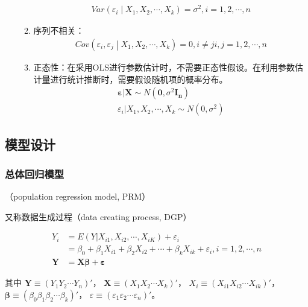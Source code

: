 \documentclass[12pt]{book}
\begin{document}
\begin{enumerate}[1.]
\begin{enumerate}[(1)]
                    \begin{gather*}
                        Var\left(\varepsilon_i\middle| X_1,X_2,\cdots,X_k\right)=\sigma^2,i=1,2,\cdots,n
                    \end{gather*}
              \item 序列不相关：
                    \begin{gather*}
                        Cov\left (\varepsilon_i,\varepsilon_j\middle| X_1,X_2,\cdots,X_k\right)=0,i\neq j  i,j=1,2,\cdots,n
                    \end{gather*}
              \item 正态性：在采用OLS进行参数估计时，不需要正态性假设。在利用参数估计量进行统计推断时，需要假设随机项的概率分布。
                    \begin{gather*}
                        \bm{\varepsilon}|\mathbf{X}\sim N(\mathbf{0},\sigma^2\mathbf{I_n})\\
                        \varepsilon_i|X_1,X_2,\cdots,X_k\sim N(0,\sigma^2)
                    \end{gather*}
          \end{enumerate}
\end{enumerate}



\subsection{模型设计}

\subsubsection{总体回归模型}

（population regression model, PRM）

又称数据生成过程（data creating process, DGP）

\begin{align*}
Y_{i} &= E(Y|X_{i1},X_{i2},\cdots,X_{iK})+\varepsilon_{i}\\ 
&=\beta_{0} + \beta_{1}X_{i1}+\beta_{2}X_{i2}+\cdots+\beta_{k}X_{ik}+\varepsilon_{i}, i=1,2,⋯,n\\ 
\bm{Y}&=\bm{X\beta}+\bm{\varepsilon}
\end{align*}


其中
$\bm{Y}\equiv (Y_{1} Y_{2} \cdots  Y_{n})'$，
$\bm{X}\equiv (X_{1} X_{2} \cdots X_{k})'$，
$X_{i}\equiv (X_{i1} X_{i2} ⋯ X_{ik})'$，
$\bm{\beta}\equiv (\beta_{0} \beta_{1} \beta_{2} \cdots \beta_{k})'$，
$\varepsilon \equiv (\varepsilon_{1} \varepsilon_{2} \cdots \varepsilon_{n})'$。
\end{document}
